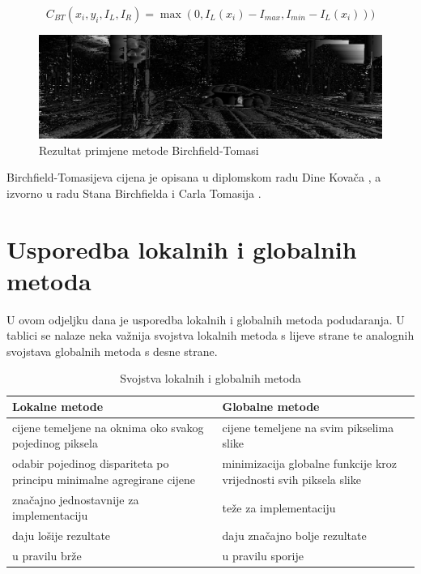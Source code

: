 \documentclass[utf8, zavrsni, numeric]{fer}
\begin{document}
\begin{equation}
C_{BT}(x_i, y_i, I_L, I_R) = \max(0, I_L(x_i) - I_{max}, I_{min} - I_L(x_i)))
\end{equation}

\begin{figure}[htb]
  \centering
  \includegraphics[width=14cm]{img/local_000046_10_BT_1_140_scaled.png}
  \caption{Rezultat primjene metode Birchfield-Tomasi}
  \label{fig:BT-KITTI}
\end{figure}

Birchfield-Tomasijeva cijena je opisana u diplomskom radu Dine Kovača \cite{kovac15ms}, a izvorno u radu Stana Birchfielda i Carla Tomasija \cite{birchfield1998depth}.

\section{Usporedba lokalnih i globalnih metoda}
U ovom odjeljku dana je usporedba lokalnih i globalnih metoda podudaranja.
U tablici se nalaze neka važnija svojstva lokalnih metoda s lijeve strane te
analognih svojstava globalnih metoda s desne strane.

\begin{table}[H]
  \caption{Svojstva lokalnih i globalnih metoda}
  \label{tbl:usp_lok_glob}
  \centering
  \begin{tabularx}{\textwidth}{X|X} \hline
    {\bf Lokalne metode} & {\bf Globalne metode} \\
    \hline
    cijene temeljene na oknima oko svakog pojedinog piksela & cijene temeljene na svim pikselima slike \\
    \hline
    odabir pojedinog dispariteta po principu minimalne agregirane cijene & minimizacija globalne funkcije kroz vrijednosti svih piksela slike \\
    \hline
    značajno jednostavnije za implementaciju & teže za implementaciju \\
    \hline
    daju lošije rezultate & daju značajno bolje rezultate \\
    \hline
    u pravilu brže & u pravilu sporije \\
  \end{tabularx}
\end{table}
\end{document}
